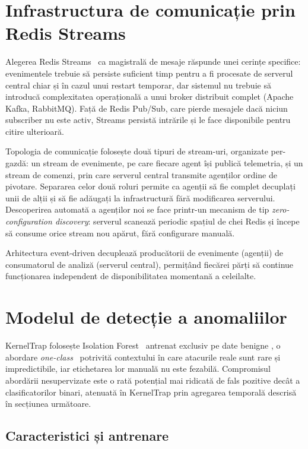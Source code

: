 \section{Infrastructura de comunicație prin Redis Streams}

Alegerea Redis Streams~\cite{redis2024streams} ca magistrală de mesaje răspunde unei cerințe
specifice: evenimentele trebuie să persiste suficient timp pentru a fi procesate de serverul
central chiar și în cazul unui restart temporar, dar sistemul nu trebuie să introducă
complexitatea operațională a unui broker distribuit complet (Apache Kafka, RabbitMQ). Față de
Redis Pub/Sub, care pierde mesajele dacă niciun subscriber nu este activ, Streams persistă
intrările și le face disponibile pentru citire ulterioară.

Topologia de comunicație folosește două tipuri de stream-uri, organizate per-gazdă:
un stream de evenimente, pe care fiecare agent își publică telemetria, și un stream de
comenzi, prin care serverul central transmite agenților ordine de pivotare. Separarea celor
două roluri permite ca agenții să fie complet decuplați unii de alții și să fie adăugați la
infrastructură fără modificarea serverului. Descoperirea automată a agenților noi se face
printr-un mecanism de tip \textit{zero-configuration discovery}: serverul scanează periodic
spațiul de chei Redis și începe să consume orice stream nou apărut, fără configurare manuală.

Arhitectura event-driven decuplează producătorii de evenimente (agenții) de consumatorul de
analiză (serverul central), permițând fiecărei părți să continue funcționarea independent de
disponibilitatea momentană a celeilalte.


\section{Modelul de detecție a anomaliilor}


KernelTrap folosește Isolation Forest~\cite{liu2008iforest} antrenat exclusiv pe date benigne
, o abordare \textit{one-class}~\cite{chandola2009anomaly} potrivită contextului în care
atacurile reale sunt rare și impredictibile, iar etichetarea lor manuală nu este fezabilă.
Compromisul abordării nesupervizate este o rată potențial mai ridicată de fals pozitive decât
a clasificatorilor binari, atenuată în KernelTrap prin agregarea temporală descrisă în secțiunea
următoare.

\subsection{Caracteristici și antrenare}

